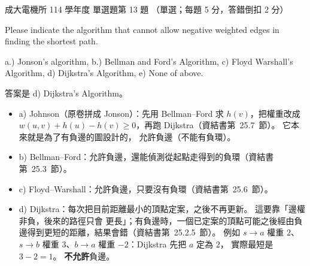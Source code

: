 \begin{pastexam}[label={px:ncku-114-ee-ds-13}]{成大電機所 114 學年度 單選題第 13 題}
（單選；每題 5 分，答錯倒扣 2 分）

Please indicate the algorithm that cannot allow negative weighted edges in finding the shortest
path.

a.) Jonson's algorithm, \quad b.) Bellman and Ford's Algorithm, \quad c) Floyd Warshall's
Algorithm, \quad d) Dijkstra's Algorithm, \quad e) None of above.
\end{pastexam}

\begin{pastsoln}
答案是 d) Dijkstra's Algorithm。

\begin{itemize}
\item a) Johnson（原卷拼成 Jonson）：先用 Bellman--Ford 求 $h(v)$，把權重改成
$w(u, v) + h(u) - h(v) \ge 0$，再跑 Dijkstra（資結書第~25.7~節）。 它本來就是為了有負邊的圖設計的，
允許負邊（不能有負環）。
\item b) Bellman--Ford：允許負邊，還能偵測從起點走得到的負環（資結書第~25.3~節）。
\item c) Floyd--Warshall：允許負邊，只要沒有負環（資結書第~25.6~節）。
\item d) Dijkstra：每次把目前距離最小的頂點定案，之後不再更新。 這要靠「邊權非負，後來的路徑只會
更長」；有負邊時，一個已定案的頂點可能之後經由負邊得到更短的距離，結果會錯（資結書第~25.2.5~節）。
例如 $s \to a$ 權重 $2$、$s \to b$ 權重 $3$、$b \to a$ 權重 $-2$：Dijkstra 先把 $a$ 定為 $2$，
實際最短是 $3 - 2 = 1$。 \textbf{不允許}負邊。
\end{itemize}
\end{pastsoln}
